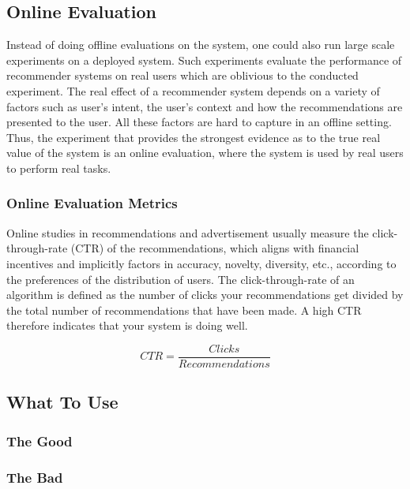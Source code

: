 
\subsection{Online Evaluation}

Instead of doing offline evaluations on the system, one could also run large
scale experiments on a deployed system. Such experiments evaluate the
performance of recommender systems on real users which are oblivious to the
conducted experiment. The real effect of a recommender system depends on a
variety of factors such as user’s intent, the user’s context and how the
recommendations are presented to the user. All these factors are hard to
capture in an offline setting. Thus, the experiment that provides the strongest evidence as to the true real value of the system is an online evaluation, where the system is used by real users to perform real tasks.

\subsubsection{Online Evaluation Metrics}

Online studies in recommendations and advertisement usually measure the click-through-rate (CTR) of the recommendations,
which aligns with financial incentives and implicitly factors in accuracy,
novelty, diversity, etc., according to the preferences of the distribution of users.
The click-through-rate of an algorithm is defined as the number of clicks your
recommendations get divided by the total number of recommendations that
have been made. A high CTR therefore indicates that your system is doing
well.

\begin{equation}
CTR = \frac{Clicks}{Recommendations}
\end{equation}

\subsection{What To Use}


\subsubsection{The Good}


\subsubsection{The Bad}

